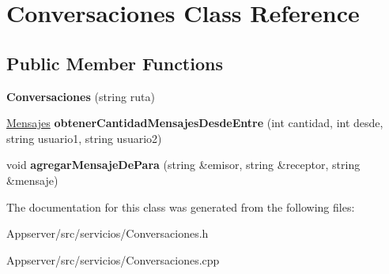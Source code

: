 \hypertarget{classConversaciones}{}\section{Conversaciones Class Reference}
\label{classConversaciones}
\subsection*{Public Member Functions}
\begin{DoxyCompactItemize}
\item 
{\bfseries Conversaciones} (string ruta)\hypertarget{classConversaciones_ae651d149095382672076900121fd8067}{}\label{classConversaciones_ae651d149095382672076900121fd8067}

\item 
\hyperlink{classMensajes}{Mensajes} {\bfseries obtener\+Cantidad\+Mensajes\+Desde\+Entre} (int cantidad, int desde, string usuario1, string usuario2)\hypertarget{classConversaciones_a9453bdc8b3fb01408684ec2441e17121}{}\label{classConversaciones_a9453bdc8b3fb01408684ec2441e17121}

\item 
void {\bfseries agregar\+Mensaje\+De\+Para} (string \&emisor, string \&receptor, string \&mensaje)\hypertarget{classConversaciones_a76e644eb0db6496348caf3b8dade1b54}{}\label{classConversaciones_a76e644eb0db6496348caf3b8dade1b54}

\end{DoxyCompactItemize}


The documentation for this class was generated from the following files\+:\begin{DoxyCompactItemize}
\item 
Appserver/src/servicios/Conversaciones.\+h\item 
Appserver/src/servicios/Conversaciones.\+cpp\end{DoxyCompactItemize}
